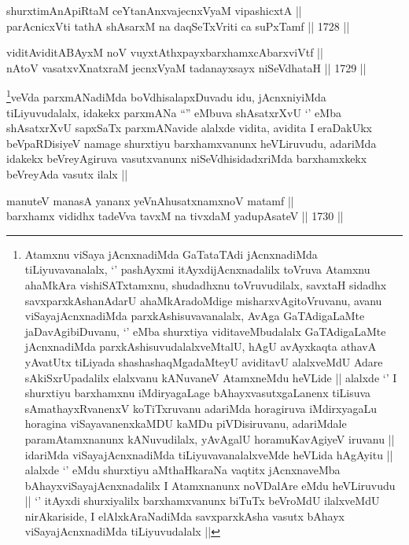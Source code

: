 \begin{shl}
shurxtimAnApiRtaM ceYtanAnxvajecnxVyaM vipashicxtA || \\
parAcnicxVti tathA shAsarxM na daqSeTxVriti ca suPxTamf ||  1728 ||  
\end{shl}
				
\begin{shl}
viditAviditABAyxM noV vuyxtAthxpayxbarxhamxcAbarxviVtf ||  \\
nAtoV vasatxvXnatxraM jecnxVyaM tadanayxsayx niSeVdhataH ||  1729 ||  
\end{shl}

\begin{artha}
\footnote[3]{Atamxnu viSaya jAcnxnadiMda GaTataTAdi jAcnxnadiMda
  tiLiyuvavanalalx, `\stext' pashAyxmi itAyxdijAcnxnadalilx toVruva
  Atamxnu ahaMkAra vishiSATxtamxnu, shudadhxnu toVruvudilalx, savxtaH
  sidadhx savxparxkAshanAdarU ahaMkAradoMdige misharxvAgitoVruvanu,
  avanu viSayajAcnxnadiMda parxkAshisuvavanalalx, AvAga GaTAdigaLaMte
  jaDavAgibiDuvanu, `\stext' eMba shurxtiya viditaveMbudalalx
  GaTAdigaLaMte jAcnxnadiMda parxkAshisuvudalalxveMtalU, hAgU
  avAyxkaqta athavA yAvatUtx tiLiyada shashashaqMgadaMteyU aviditavU
  alalxveMdU Adare sAkiSxrUpadalilx elalxvanu kANuvaneV AtamxneMdu
  heVLide || alalxde `\stext' I shurxtiyu  barxhamxnu iMdiryagaLage
  bAhayxvasutxgaLanenx tiLisuva sAmathayxRvanenxV koTiTxruvanu
  adariMda horagiruva iMdirxyagaLu horagina viSayavanenxkaMDU kaMDu
  piVDisiruvanu, adariMdale paramAtamxnanunx kANuvudilalx, yAvAgalU
  horamuKavAgiyeV iruvanu || idariMda viSayajAcnxnadiMda
  tiLiyuvavanalalxveMde heVLida hAgAyitu ||
alalxde `\stext' eMdu shurxtiyu aMthaHkaraNa vaqtitx jAcnxnaveMba
bAhayxviSayajAcnxnadalilx I Atamxnanunx noVDalAre eMdu heVLiruvudu ||
`\stext' itAyxdi shurxiyalilx barxhamxvanunx biTuTx beVroMdU
ilalxveMdU nirAkariside, I elAlxkAraNadiMda savxparxkAsha vasutx
bAhayx viSayajAcnxnadiMda tiLiyuvudalalx ||}veVda parxmANadiMda boVdhisalapxDuvadu idu, jAcnxniyiMda
tiLiyuvudalalx, idakekx parxmANa ``\stext'' eMbuva shAsatxrXvU
`\stext' eMba shAsatxrXvU sapxSaTx parxmANavide alalxde vidita,
avidita I eraDakUkx beVpaRDisiyeV namage shurxtiyu barxhamxvanunx
heVLiruvudu, adariMda idakekx beVreyAgiruva vasutxvanunx
niSeVdhisidadxriMda barxhamxkekx beVreyAda vasutx ilalx ||
\end{artha}


\begin{shl}
manuteV manasA yananx yeVnA\s \s husatxnamxnoV matamf || \\
barxhamx vididhx tadeVva tavxM na tivxdaM yadupAsateV ||  1730 ||  
\end{shl}
				
